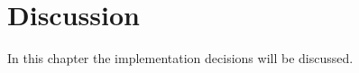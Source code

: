 \chapter{Discussion}
\label{chp:disc}

In this chapter the implementation decisions will be discussed.